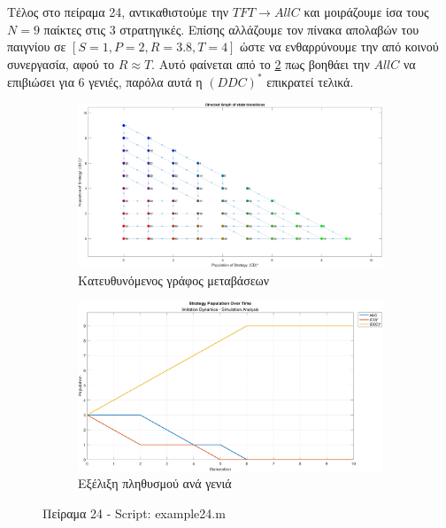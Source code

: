 \documentclass[12pt]{report}
\begin{document}
Τέλος στο πείραμα 24, αντικαθιστούμε την $TFT\xrightarrow{}AllC$ και μοιράζουμε ίσα τους $N=9$ παίκτες στις 3 στρατηγικές. Επίσης αλλάζουμε τον πίνακα απολαβών του παιγνίου σε $[S=1,P=2,R=3.8,T=4]$ ώστε να ενθαρρύνουμε την από κοινού συνεργασία, αφού το $R \approx T$. Αυτό φαίνεται από το \ref{fig:fig24-sim} πως βοηθάει την $AllC$ να επιβιώσει για 6 γενιές, παρόλα αυτά η $(DDC)^*$ επικρατεί τελικά. 
\begin{figure}[H]
    \centering

    \begin{subfigure}[b]{0.45\textwidth}
        \includegraphics[width=\linewidth]{Figures Imitation Dynamics/example24.png}
        \caption{Κατευθυνόμενος γράφος μεταβάσεων}
        \label{fig:fig24}
    \end{subfigure}
    \hfill
    \begin{subfigure}[b]{0.45\textwidth}
        \includegraphics[width=\linewidth]{Figures Imitation Dynamics/example24-sim.png}
        \caption{Εξέλιξη πληθυσμού ανά γενιά}
        \label{fig:fig24-sim}
    \end{subfigure}

    \caption{Πείραμα 24 - \foreignlanguage{english}{Script: example24.m}}
    \label{fig:example24}
\end{figure}
\end{document}
